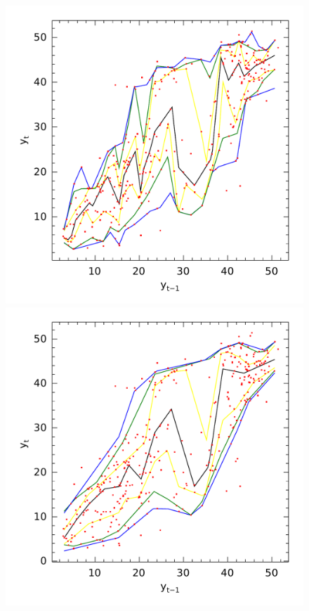 \begin{figure}[htp]
\begin{minipage}[t]{0.4\linewidth}
\begin{minipage}[b]{\linewidth}
      \centering     \includegraphics[width=\textwidth]{Figuras/npqar/icaraizinho-crossing-03}
    \end{minipage}
     \begin{minipage}[b]{\linewidth}
      \centering     \includegraphics[width=\textwidth]{Figuras/npqar/icaraizinho-crossing-1}

\end{minipage}
\end{minipage}
\end{figure}
